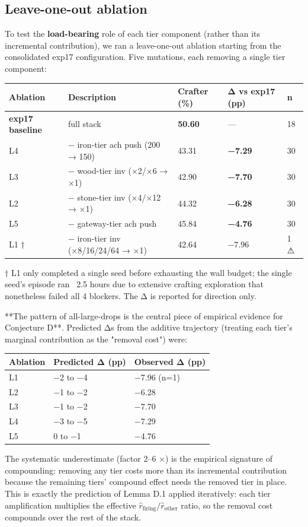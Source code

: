 \documentclass[11pt,letterpaper]{article}
\begin{document}
\subsection{Leave-one-out ablation}

To test the \textbf{load-bearing} role of each tier component (rather than
its incremental contribution), we ran a leave-one-out ablation
starting from the consolidated exp17 configuration. Five mutations,
each removing a single tier component:

\begin{tabular}{l l l l l}
\toprule
Ablation & Description & Crafter (\%) & Δ vs exp17 (pp) & n \\
\midrule
\textbf{exp17 baseline} & full stack & \textbf{50.60} & — & 18 \\
L4 & − iron-tier ach push (200 → 150) & 43.31 & \textbf{−7.29} & 30 \\
L3 & − wood-tier inv (×2/×6 → ×1) & 42.90 & \textbf{−7.70} & 30 \\
L2 & − stone-tier inv (×4/×12 → ×1) & 44.32 & \textbf{−6.28} & 30 \\
L5 & − gateway-tier ach push & 45.84 & \textbf{−4.76} & 30 \\
L1 † & − iron-tier inv (×8/16/24/64 → ×1) & 42.64 & −7.96 & 1 ⚠ \\
\bottomrule
\end{tabular}

† L1 only completed a single seed before exhausting the wall budget;
the single seed's episode ran ~2.5 hours due to extensive crafting
exploration that nonetheless failed all 4 blockers. The Δ is reported
for direction only.

**The pattern of all-large-drops is the central piece of empirical
evidence for Conjecture D**. Predicted Δs from the additive trajectory
(treating each tier's marginal contribution as the "removal cost")
were:

\begin{tabular}{l l l}
\toprule
Ablation & Predicted Δ (pp) & Observed Δ (pp) \\
\midrule
L1 & −2 to −4 & −7.96 (n=1) \\
L2 & −1 to −2 & −6.28 \\
L3 & −1 to −2 & −7.70 \\
L4 & −3 to −5 & −7.29 \\
L5 & 0 to −1 & −4.76 \\
\bottomrule
\end{tabular}

The systematic underestimate (factor 2–6 ×) is the empirical signature
of compounding: removing any tier costs more than its incremental
contribution because the remaining tiers' compound effect needs the
removed tier in place. This is exactly the prediction of Lemma D.1
applied iteratively: each tier amplification multiplies the effective
$\widehat{r}_{\text{firing}}/\widehat{r}_{\text{other}}$ ratio, so the
removal cost compounds over the rest of the stack.
\end{document}

